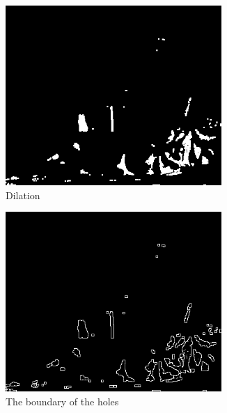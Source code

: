 \documentclass{article}
\begin{document}
\begin{CJK*}{UTF8}{bkai}
\begin{figure}[h]
\begin{subfigure}[h]{0.3\textwidth}
        \centering
        \includegraphics[width=0.9\textwidth]{results/holes_dilated.png}
        \caption{Dilation}
        \label{fig:details_of_our_improvement_dilation}
    \end{subfigure}
    \begin{subfigure}[h]{0.3\textwidth}
        \centering
        \includegraphics[width=0.9\textwidth]{results/boundries.png}
        \caption{The boundary of the holes}
        \label{fig:details_of_our_improvement_boundary}
    \end{subfigure}
    \begin{subfigure}[h]{0.3\textwidth}
        \centering

\end{subfigure}
\end{figure}
\end{CJK*}
\end{document}
